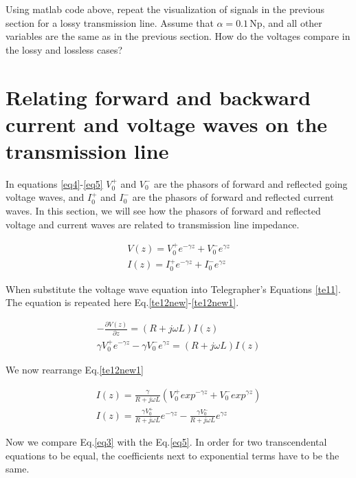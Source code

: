\documentclass{ximera}
\begin{document}
Using matlab code above, repeat the visualization of signals  in the previous section for a lossy transmission line. Assume that $\alpha=0.1$\,Np, and all other variables are the same as in the previous section. How do the voltages compare in the lossy and lossless cases?

\section{Relating forward and backward current and voltage waves on
the transmission line}


In equations \ref{eq4}-\ref{eq5} $V_0^+$ and $V_0^-$ are the phasors of forward and
reflected going voltage waves, and $I_0^+$ and $I_0^-$ are the phasors of forward and
reflected  current waves. In this section, we will see how the phasors of forward and reflected voltage and
current waves are related to transmission line impedance.


\begin{eqnarray}
V(z)=V_0^+ e^{-\gamma z} + V_0^- e^{\gamma z}\label{eq4} \\
I(z)=I_0^+ e^{-\gamma z} + I_0^- e^{\gamma z}\label{eq5}
\end{eqnarray}




When substitute the voltage wave equation into Telegrapher's  Equations
\ref{te11}. The equation is repeated here  Eq.\ref{te12new}-\ref{te12new1}.




\begin{eqnarray}
-\frac{\partial V(z)}{\partial z} = (R+j\omega L) I(z) \label{te12new} \\
\gamma V_0^+ e^{-\gamma z} - \gamma V_0^- e^{\gamma z} = (R+ j \omega
L) I(z) \label{te12new1}
\end{eqnarray}

We now rearrange Eq.\ref{te12new1}

\begin{eqnarray}
I(z)=\frac{\gamma}{R+j\omega L} ( V_0^+ exp^{-\gamma z} + V_0^-
 exp^{\gamma z})  \nonumber  \\
I(z)=\frac{\gamma V_0^+}{R+ j \omega L} e^{-\gamma z} - \frac{\gamma V_0^-}{R+ j \omega L} e^{\gamma z} \label{eq3}
\end{eqnarray}

Now we compare Eq.\ref{eq3} with the Eq.\ref{eq5}. In order for two transcendental equations to be equal, the coefficients next to exponential terms have to be the same.
\end{document}
